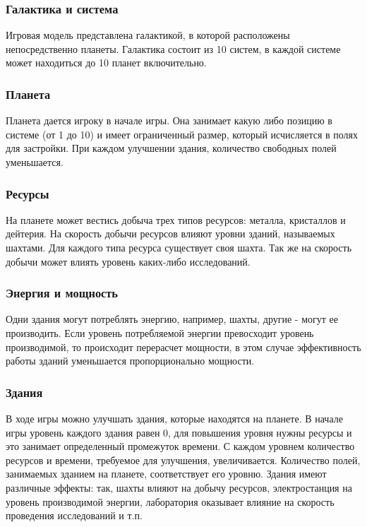 \subsubsection{Галактика и система}
Игровая модель представлена галактикой, в которой расположены непосредственно планеты. Галактика состоит из 10 систем, в каждой системе может находиться до 10 планет включительно.	

\subsubsection{Планета}
Планета дается игроку в начале игры. Она занимает какую либо позицию в системе (от 1 до 10) и имеет ограниченный размер, который исчисляется в полях для застройки. При каждом улучшении здания, количество свободных полей уменьшается. 

\subsubsection{Ресурсы}
На планете может вестись добыча трех типов ресурсов: металла, кристаллов и дейтерия. На скорость добычи ресурсов влияют уровни зданий, называемых шахтами. Для каждого типа ресурса существует своя шахта. Так же на скорость добычи может влиять уровень каких-либо исследований.

\subsubsection{Энергия и мощность}
Одни здания могут потреблять энергию, например, шахты, другие - могут ее производить. Если уровень потребляемой энергии превосходит уровень производимой, то происходит перерасчет мощности, в этом случае эффективность работы зданий уменьшается пропорционально мощности.  

\subsubsection{Здания}
В ходе игры можно улучшать здания, которые находятся на планете. В начале игры уровень каждого здания равен 0, для повышения уровня нужны ресурсы и это занимает определенный промежуток времени. С каждом уровнем количество ресурсов и времени, требуемое для улучшения, увеличивается. Количество полей, занимаемых зданием на планете, соответствует его уровню. Здания имеют различные эффекты: так, шахты влияют на добычу ресурсов, электростанция на уровень производимой энергии, лаборатория оказывает влияние на скорость проведения исследований и т.п.

